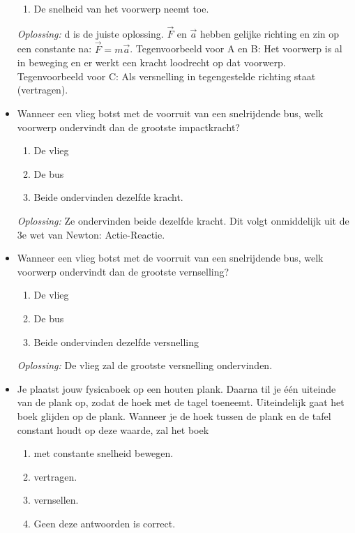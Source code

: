 \documentclass[12pt,a4paper]{article}
\begin{document}
\begin{itemize}
\begin{enumerate}[label=\alph*]
    	\item De snelheid van het voorwerp neemt toe.
    \end{enumerate}
    \textit{Oplossing:} d is de juiste oplossing. $\vec{F}$ en $\vec{a}$ hebben gelijke richting en zin op een constante na: \(\vec{F} = m\vec{a}\). Tegenvoorbeeld voor A en B: Het voorwerp is al in beweging en er werkt een kracht loodrecht op dat voorwerp. Tegenvoorbeeld voor C: Als versnelling in tegengestelde richting staat (vertragen).
    \newline
    \item Wanneer een vlieg botst met de voorruit van een snelrijdende bus, welk voorwerp ondervindt dan de grootste impactkracht?
    \begin{enumerate}[label=\alph*]
    	\item De vlieg
    	\item De bus
    	\item Beide ondervinden dezelfde kracht.
    \end{enumerate}
    \textit{Oplossing:} Ze ondervinden beide dezelfde kracht. Dit volgt onmiddelijk uit de 3e wet van Newton: Actie-Reactie. 
    \newline
    \item Wanneer een vlieg botst met de voorruit van een snelrijdende bus, welk voorwerp ondervindt dan de grootste vernselling?
    \begin{enumerate}[label=\alph*]
    	\item De vlieg
    	\item De bus
    	\item Beide ondervinden dezelfde versnelling
    \end{enumerate}
    \textit{Oplossing:} De vlieg zal de grootste versnelling ondervinden. 
    \newline
    \item Je plaatst jouw fysicaboek op een houten plank. Daarna til je één uiteinde van de plank op, zodat de hoek met de tagel toeneemt. Uiteindelijk gaat het boek glijden op de plank. Wanneer je de hoek tussen de plank en de tafel constant houdt op deze waarde, zal het boek
    \begin{enumerate}[label=\alph*]
    	\item met constante snelheid bewegen.
    	\item vertragen.
    	\item vernsellen.
    	\item Geen deze antwoorden is correct. 
    \end{enumerate}

\end{itemize}
\end{document}
